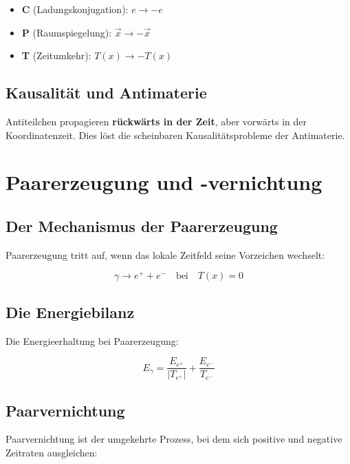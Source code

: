 \documentclass[12pt,a4paper]{report}
\begin{document}
	\begin{itemize}
		\item \textbf{C} (Ladungskonjugation): $e \to -e$
		\item \textbf{P} (Raumspiegelung): $\vec{x} \to -\vec{x}$
		\item \textbf{T} (Zeitumkehr): $T(x) \to -T(x)$
	\end{itemize}
	
	\subsection{Kausalität und Antimaterie}
	
	Antiteilchen propagieren \textbf{rückwärts in der Zeit}, aber vorwärts in der Koordinatenzeit. Dies löst die scheinbaren Kausalitätsprobleme der Antimaterie.
	
	\section{Paarerzeugung und -vernichtung}
	
	\subsection{Der Mechanismus der Paarerzeugung}
	
	Paarerzeugung tritt auf, wenn das lokale Zeitfeld seine Vorzeichen wechselt:
	
	\begin{equation}
		\gamma \to e^+ + e^- \quad \text{bei} \quad T(x) = 0
	\end{equation}
	
	\subsection{Die Energiebilanz}
	
	Die Energieerhaltung bei Paarerzeugung:
	
	\begin{equation}
		E_\gamma = \frac{E_{e^+}}{|T_{e^+}|} + \frac{E_{e^-}}{T_{e^-}}
	\end{equation}
	
	\subsection{Paarvernichtung}
	
	Paarvernichtung ist der umgekehrte Prozess, bei dem sich positive und negative Zeitraten ausgleichen:
	
\end{document}
